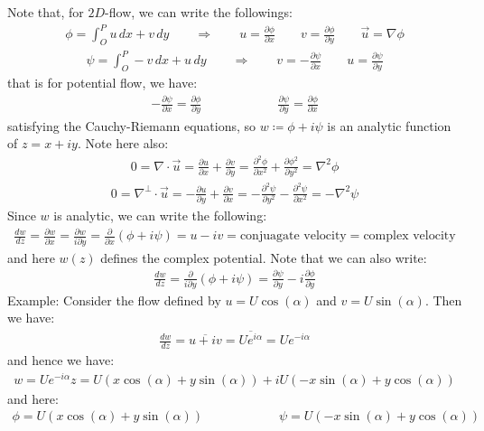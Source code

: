 \documentclass[11pt]{book}
\theoremstyle{break}
\theoremstyle{break}
\newcommand{\pd}{\partial}
\newcommand{\example}{\color{green}Example: \color{black}}
\begin{document}
Note that, for $2D$-flow, we can write the followings:
\begin{align*}
\phi = \int_O^P u\, dx + v\, dy \qquad \Rightarrow \qquad u = \frac{\partial \phi}{\partial x} \qquad v = \frac{\partial \phi}{\partial y} \qquad \vec{u} = \nabla \phi
\end{align*}
\begin{align*}
\psi = \int_O^P -v \, dx + u\, dy \qquad \Rightarrow \qquad v = -\frac{\partial \psi}{\partial x} \qquad u = \frac{\partial \psi}{\partial y}
\end{align*}
that is for potential flow, we have:
\begin{align*}
-\frac{\partial \psi}{\pd x} = \frac{\pd \phi}{\pd y} \qquad\qquad \qquad \frac{\pd \psi}{\pd y} = \frac{\pd \phi}{\pd x}
\end{align*}
satisfying the Cauchy-Riemann equations, so $w \coloneqq \phi + i\psi$ is an analytic function of $z = x+iy$. Note here also:
\begin{align*}
0 = \nabla \cdot\vec{u} = \frac{\pd u}{\pd x}+ \frac{\pd v}{\pd y} = \frac{\pd^2 \phi}{\pd x^2} + \frac{\pd \phi^2}{\pd y^2} = \nabla^2 \phi
\end{align*}
\begin{align*}
0 = \nabla^\perp \cdot \vec{u} = -\frac{\pd u}{\pd y}+\frac{\pd v}{\pd x} = -\frac{\pd^2 \psi}{\pd y^2} - \frac{\pd^2 \psi}{\pd x^2} = -\nabla^2 \psi
\end{align*}
Since $w$ is analytic, we can write the following:
\begin{align*}
\frac{dw}{dz } = \frac{\partial w}{\partial x} = \frac{\partial w}{i \partial y} = \frac{\partial}{\partial x}\left( \phi + i\psi\right) = u-iv = \text{conjuagate velocity} = \text{complex velocity}
\end{align*}
and here $w(z)$ defines the complex potential. Note that we can also write:
\begin{align*}
\frac{dw}{dz} = \frac{\partial}{i \partial y}(\phi+i \psi) = \frac{\partial \psi}{\partial y} - i\frac{\partial \phi}{\partial y}
\end{align*}
\example Consider the flow defined by $u = U \cos(\alpha)$ and $v = U \sin(\alpha)$. Then we have:
\begin{align*}
\frac{dw}{dz} = \overline{u + iv} = \overline{U e^{i\alpha}} = U e^{-i\alpha}
\end{align*}
and hence we have:
\begin{align*}
w = U e^{-i\alpha}z = U \left( x\cos(\alpha)+y \sin(\alpha)\right)+i U(-x\sin(\alpha) + y \cos(\alpha)) 
\end{align*}
and here:
\begin{align*}
\phi = U (x\cos(\alpha) + y \sin(\alpha)) \qquad\qquad\qquad \psi = U(-x\sin(\alpha) + y \cos(\alpha))
\end{align*}
\end{document}

